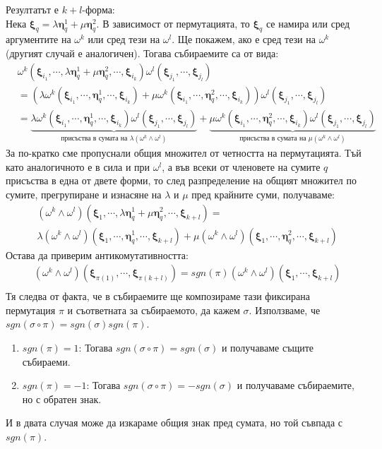 \documentclass[12pt]{article}
\newcommand\myxi[0]{\boldsymbol{\xi}}
\newcommand\myeta[0]{\boldsymbol{\eta}}
\begin{document}
\begin{large}
Резултатът е $k+l$-форма:\\
Нека $\myxi_q=\lambda\myeta_q^1+\mu\myeta_q^2$. В зависимост от пермутацията, то $\myxi_q$ се намира или сред аргументите на $\omega^k$ или сред тези на $\omega^l$. Ще покажем, ако е сред тези на $\omega^k$(другият случай е аналогичен). Тогава събираемите са от вида:
\begin{align*}
&\omega^k(\myxi_{i_1},\cdots,\lambda\myeta_q^1+\mu\myeta_q^2 ,\cdots,\myxi_{i_k})\omega^l(\myxi_{j_1},\cdots,\myxi_{j_l}) \\
&=(\lambda\omega^k(\myxi_{i_1},\cdots,\myeta_q^1,\cdots,\myxi_{i_k}) + \mu\omega^k(\myxi_{i_1},\cdots,\myeta_q^2,\cdots,\myxi_{i_k}))\omega^l(\myxi_{j_1},\cdots,\myxi_{j_l}) \\
&=\underbrace{\lambda\omega^k(\myxi_{i_1},\cdots,\myeta_q^1,\cdots,\myxi_{i_k})\omega^l(\myxi_{j_1},\cdots,\myxi_{j_l})
}_{\text{присъства в сумата на $\lambda(\omega^k \wedge \omega^l)$}}+
\underbrace{\mu\omega^k(\myxi_{i_1},\cdots,\myeta_q^2,\cdots,\myxi_{i_k})\omega^l(\myxi_{j_1},\cdots,\myxi_{j_l})
}_{\text{присъства в сумата на $\mu(\omega^k \wedge \omega^l)$}}
\end{align*}
За по-кратко сме пропуснали общия множител от четността на пермутацията. Тъй като аналогичното е в сила и при $\omega^l$, а във всеки от членовете на сумите $q$ присъства в една от двете форми, то след разпределение на общият множител по сумите, прегрупиране и изнасяне на $\lambda$ и $\mu$ пред крайните суми, получаваме:
\begin{align*}
&(\omega^k \wedge \omega^l)(\myxi_1,\cdots,\lambda\myeta_q^1+\mu\myeta_q^2,\cdots,\myxi_{k+l})=\\
&\lambda(\omega^k \wedge \omega^l)(\myxi_1,\cdots,\myeta_q^1,\cdots,\myxi_{k+l})+ \mu(\omega^k \wedge \omega^l)(\myxi_1,\cdots,\myeta_q^2,\cdots,\myxi_{k+l})
\end{align*}
Остава да приверим антикомутативността:
\begin{align*}
&(\omega^k \wedge \omega^l)(\myxi_{\pi(1)},\cdots,\myxi_{\pi(k+l)})= sgn(\pi)(\omega^k \wedge \omega^l)(\myxi_1,\cdots,\myxi_{k+l}) \\
\end{align*}
Тя следва от факта, че в събираемите ще композираме тази фиксирана пермутация $\pi$ и съответната за събираемото, да кажем $\sigma$. Използваме, че $sgn(\sigma \circ \pi)=sgn(\sigma)sgn(\pi)$.
\begin{enumerate}[label=\alph*)]
\item $sgn(\pi)=1$: Тогава $sgn(\sigma \circ \pi)=sgn(\sigma)$ и получаваме същите събираеми.
\item $sgn(\pi)=-1$: Тогава $sgn(\sigma \circ \pi)=-sgn(\sigma)$ и получаваме събираемите, но с обратен знак.
\end{enumerate}
И в двата случая може да изкараме общия знак пред сумата, но той съвпада с $sgn(\pi)$.


\end{large}
\end{document}
